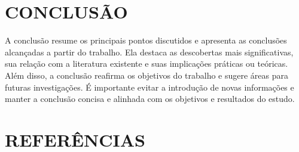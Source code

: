 \documentclass[dissertacao]{iftex2024}
\begin{document}
\chapter{CONCLUSÃO}

A conclusão resume os principais pontos discutidos e apresenta as conclusões alcançadas a partir do trabalho.
Ela destaca as descobertas mais significativas, sua relação com a literatura existente e suas implicações práticas ou teóricas.
Além disso, a conclusão reafirma os objetivos do trabalho e sugere áreas para futuras investigações.
É importante evitar a introdução de novas informações e manter a conclusão concisa e alinhada com os objetivos e resultados do estudo.

\chapter*{REFERÊNCIAS}

\printbibliography
\end{document}
